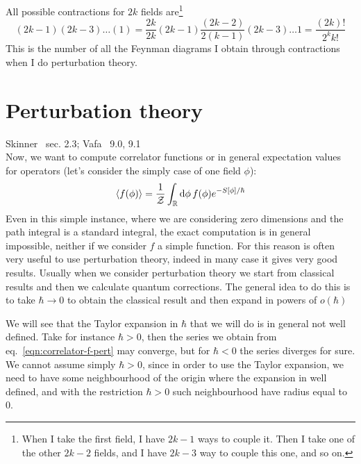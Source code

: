 \documentclass[../main/main.tex]{subfiles}
\begin{document}
All possible contractions for $2k$ fields are\footnote{When I take the first field, I have $2k-1$ ways to couple it. Then I take one of the other $2k-2$ fields, and I have $2k-3$ way to couple this one, and so on.}
\begin{equation}\label{eqn:Wick-n-possible-contr}
(2k-1)(2k-3)\dots(1)=\frac{2k}{2k}(2k-1)\frac{(2k-2)}{2(k-1)}(2k-3)\dots1=\frac{(2k)!}{2^kk!}
\end{equation}
This is the number of all the Feynman diagrams I obtain through contractions when I do perturbation theory. 


\section{Perturbation theory}

\textsf{Skinner~\cite{Skinner:2018aa} sec. 2.3; Vafa~\cite{Hori:2003ic} 9.0, 9.1}\\

Now, we want to compute correlator functions or in general expectation values for operators (let's consider the simply case of one field $\phi$):
\begin{equation}\label{eqn:correlator-f-pert}
\langle f(\phi)\rangle=\frac1{\mathcal Z}\int_{\mathbb{R}}\textup{d}\phi\, f(\phi)e^{-S[\phi]/\hbar}
\end{equation}
Even in this simple instance, where we are considering zero dimensions and the path integral is a standard integral, the exact computation is in general impossible, neither if we consider $f$  a simple function. For this reason is often very useful to use perturbation theory, indeed in many case it gives very good results. Usually when we consider perturbation theory we start from classical results and then we calculate quantum corrections. The general idea to do this is to take $\hbar\to0$ to obtain the classical result and then expand in powers of $o(\hbar)$

We will see that  the Taylor expansion in $\hbar$ that we will do is in general not well defined. Take for instance $\hbar>0$, then the series we obtain from eq.~\eqref{eqn:correlator-f-pert} may converge, but for $\hbar<0$ the series diverges for sure. We cannot assume simply $\hbar>0$, since in order to use the Taylor expansion, we need to have some neighbourhood of the origin where the expansion in well defined, and with the restriction $\hbar>0$ such neighbourhood have radius equal to 0.  
\end{document}
